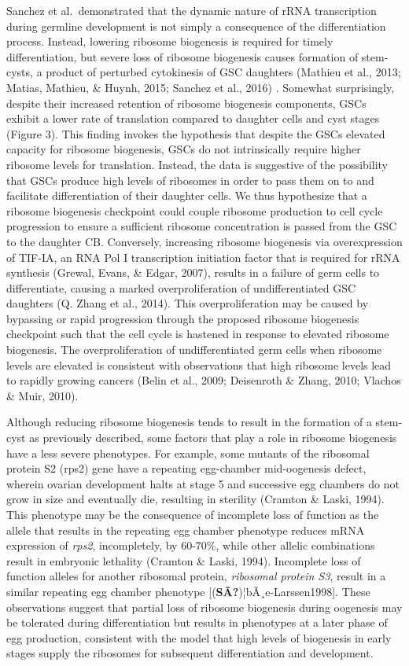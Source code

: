 \documentclass[12pt,oneside]{reedthesis}
\begin{document}
Sanchez et al.~demonstrated that the dynamic nature of rRNA
transcription during germline development is not simply a consequence of
the differentiation process. Instead, lowering ribosome biogenesis is
required for timely differentiation, but severe loss of ribosome
biogenesis causes formation of stem-cysts, a product of perturbed
cytokinesis of GSC daughters (Mathieu et al., 2013; Matias, Mathieu, \& Huynh, 2015; Sanchez et al., 2016) . Somewhat surprisingly, despite their increased
retention of ribosome biogenesis components, GSCs exhibit a lower rate
of translation compared to daughter cells and cyst stages (Figure 3).
This finding invokes the hypothesis that despite the GSCs elevated
capacity for ribosome biogenesis, GSCs do not intrinsically require
higher ribosome levels for translation. Instead, the data is suggestive
of the possibility that GSCs produce high levels of ribosomes in order
to pass them on to and facilitate differentiation of their daughter
cells. We thus hypothesize that a ribosome biogenesis checkpoint could
couple ribosome production to cell cycle progression to ensure a
sufficient ribosome concentration is passed from the GSC to the daughter
CB. Conversely, increasing ribosome biogenesis via overexpression of
TIF-IA, an RNA Pol I transcription initiation factor that is required
for rRNA synthesis (Grewal, Evans, \& Edgar, 2007), results in a failure of germ cells
to differentiate, causing a marked overproliferation of undifferentiated
GSC daughters (Q. Zhang et al., 2014). This overproliferation may be caused by
bypassing or rapid progression through the proposed ribosome biogenesis
checkpoint such that the cell cycle is hastened in response to elevated
ribosome biogenesis. The overproliferation of undifferentiated germ
cells when ribosome levels are elevated is consistent with observations
that high ribosome levels lead to rapidly growing cancers
(Belin et al., 2009; Deisenroth \& Zhang, 2010; Vlachos \& Muir, 2010).

Although reducing ribosome biogenesis tends to result in the formation
of a stem-cyst as previously described, some factors that play a role in
ribosome biogenesis have a less severe phenotypes. For example, some
mutants of the ribosomal protein S2 (rps2) gene have a repeating
egg-chamber mid-oogenesis defect, wherein ovarian development halts at
stage 5 and successive egg chambers do not grow in size and eventually
die, resulting in sterility (Cramton \& Laski, 1994). This phenotype may be
the consequence of incomplete loss of function as the allele that
results in the repeating egg chamber phenotype reduces mRNA expression
of \emph{rps2}, incompletely, by 60-70\%, while other allelic combinations
result in embryonic lethality (Cramton \& Laski, 1994). Incomplete loss of
function alleles for another ribosomal protein, \emph{ribosomal protein S3},
result in a similar repeating egg chamber phenotype
{[}(\textbf{SÃ?})¦bÃ¸e-Larssen1998{]}. These observations suggest that partial loss of
ribosome biogenesis during oogenesis may be tolerated during
differentiation but results in phenotypes at a later phase of egg
production, consistent with the model that high levels of biogenesis in
early stages supply the ribosomes for subsequent differentiation and
development.
\end{document}

